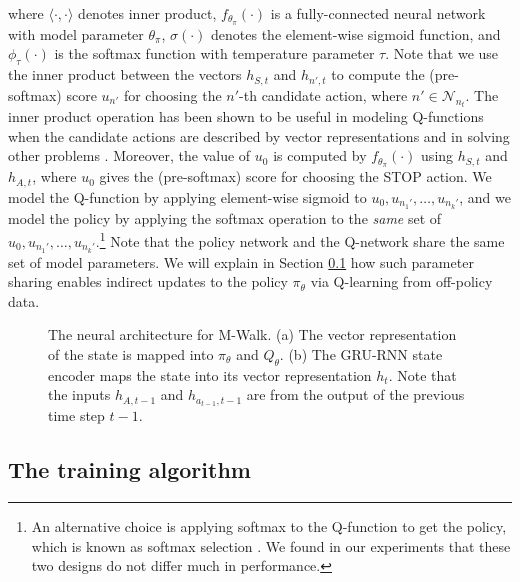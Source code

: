 \documentclass{article}
\newcommand{\mc}{\mathcal}
\newcommand{\modelname}{M-Walk}
\begin{document}
	where $\langle \cdot, \cdot \rangle$ denotes inner product, $f_{\theta_\pi}(\cdot)$ is a fully-connected neural network with model parameter $\theta_\pi$, $\sigma(\cdot)$ denotes the element-wise sigmoid function, and $\phi_{\tau}(\cdot)$ is the softmax function with temperature parameter $\tau$. Note that we use the inner product between the vectors $h_{S,t}$ and $h_{n',t}$ to compute the (pre-softmax) score $u_{n'}$ for choosing the $n'$-th candidate action, where $n' \in \mc{N}_{n_t}$. The inner product operation has been shown to be useful in modeling Q-functions when the candidate actions are described by vector representations \cite{he2015deep,chen2017q} and in solving other problems \cite{vinyals2015pointer,bello2016neural}. Moreover, the value of $u_0$ is computed by $f_{\theta_\pi}(\cdot)$ using $h_{S,t}$ and $h_{A,t}$, where $u_0$ gives the (pre-softmax) score for choosing the STOP action. We model the Q-function by applying element-wise sigmoid to $u_0,u_{n_1'},\ldots,u_{n_k'}$, and we model the policy by applying the softmax operation to the \emph{same} set of $u_0,u_{n_1'},\ldots,u_{n_k'}$.\footnote{An alternative choice is applying softmax to the Q-function to get the policy, which is known as softmax selection \cite{sutton1998reinforcement}. We found in our experiments that these two designs do not differ much in performance.} Note that the policy network and the Q-network share the same set of model parameters. We will explain in Section \ref{Sec:\modelname:Training} how such parameter sharing enables indirect updates to the policy $\pi_{\theta}$ via Q-learning from off-policy data. 
	
	
	
	\begin{figure}[t!]
		\centering
		\hfil
		\caption{{\small The neural architecture for \modelname. (a) The vector representation of the state is mapped into $\pi_{\theta}$ and $Q_{\theta}$. (b) The GRU-RNN state encoder maps the state into its vector representation $h_t$. Note that the inputs $h_{A,t-1}$ and $h_{a_{t-1},t-1}$ are from the output of the previous time step $t-1$.}}
		\label{fig:DeepRNN}
	\end{figure}
	
	
	
	
	
\subsection{The training algorithm}
\label{Sec:\modelname:Training}
	
\end{document}
